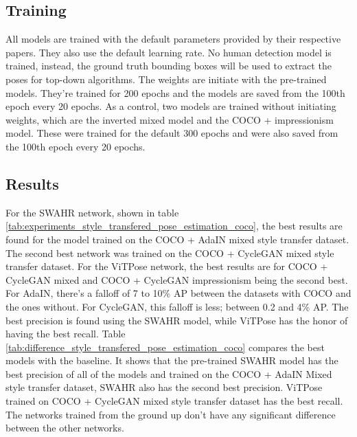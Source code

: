 \subsection{Training}
\label{sec:improvements_training_pose_estimation}
All models are trained with the default parameters provided by their respective papers.
They also use the default learning rate.
No human detection model is trained, instead, the ground truth bounding boxes will be used to extract the poses for top-down algorithms.
The weights are initiate with the pre-trained models.
They're trained for 200 epochs and the models are saved from the 100th epoch every 20 epochs.
As a control, two models are trained without initiating weights, which are the inverted mixed model and the COCO + impressionism model.
These were trained for the default 300 epochs and were also saved from the 100th epoch every 20 epochs.

\subsection{Results}
\label{sec:improvements_results_pose_estimation}
For the SWAHR network, shown in table \ref{tab:experiments_style_transfered_pose_estimation_coco}, the best results are found for the model trained on the COCO + AdaIN mixed style transfer dataset.
The second best network was trained on the COCO + CycleGAN mixed style transfer dataset.
For the ViTPose network, the best results are for COCO + CycleGAN mixed and COCO + CycleGAN impressionism being the second best.
For AdaIN, there's a falloff of 7 to 10\% AP between the datasets with COCO and the ones without.
For CycleGAN, this falloff is less; between 0.2 and 4\% AP.
The best precision is found using the SWAHR model, while ViTPose has the honor of having the best recall.
Table \ref{tab:difference_style_transfered_pose_estimation_coco} compares the best models with the baseline.
It shows that the pre-trained SWAHR model has the best precision of all of the models and trained on the COCO + AdaIN Mixed style transfer dataset, SWAHR also has the second best precision.
ViTPose trained on COCO + CycleGAN mixed style transfer dataset has the best recall.
The networks trained from the ground up don't have any significant difference between the other networks.

